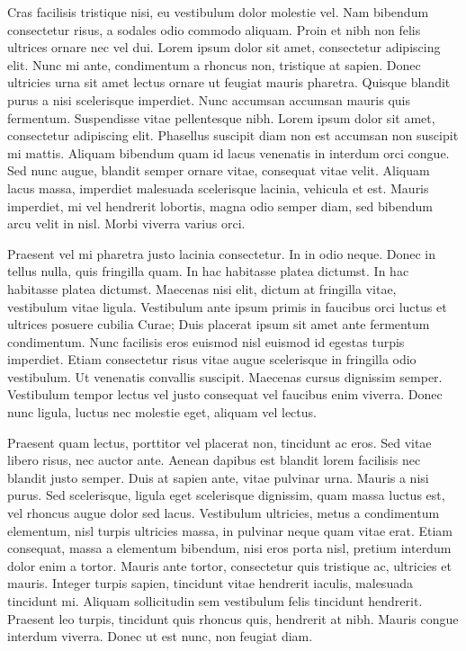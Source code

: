 \documentclass[a4paper, 12pt]{article}
\begin{document}
Cras facilisis tristique nisi, eu vestibulum dolor molestie vel. Nam
bibendum consectetur risus, a sodales odio commodo aliquam. Proin et
nibh non felis ultrices ornare nec vel dui. Lorem ipsum dolor sit
amet, consectetur adipiscing elit. Nunc mi ante, condimentum a rhoncus
non, tristique at sapien. Donec ultricies urna sit amet lectus ornare
ut feugiat mauris pharetra. Quisque blandit purus a nisi scelerisque
imperdiet. Nunc accumsan accumsan mauris quis fermentum. Suspendisse
vitae pellentesque nibh. Lorem ipsum dolor sit amet, consectetur
adipiscing elit. Phasellus suscipit diam non est accumsan non suscipit
mi mattis. Aliquam bibendum quam id lacus venenatis in interdum orci
congue. Sed nunc augue, blandit semper ornare vitae, consequat vitae
velit. Aliquam lacus massa, imperdiet malesuada scelerisque lacinia,
vehicula et est. Mauris imperdiet, mi vel hendrerit lobortis, magna
odio semper diam, sed bibendum arcu velit in nisl. Morbi viverra
varius orci.

Praesent vel mi pharetra justo lacinia consectetur. In in odio neque.
Donec in tellus nulla, quis fringilla quam. In hac habitasse platea
dictumst. In hac habitasse platea dictumst. Maecenas nisi elit, dictum
at fringilla vitae, vestibulum vitae ligula. Vestibulum ante ipsum
primis in faucibus orci luctus et ultrices posuere cubilia Curae; Duis
placerat ipsum sit amet ante fermentum condimentum. Nunc facilisis
eros euismod nisl euismod id egestas turpis imperdiet. Etiam
consectetur risus vitae augue scelerisque in fringilla odio
vestibulum. Ut venenatis convallis suscipit. Maecenas cursus dignissim
semper. Vestibulum tempor lectus vel justo consequat vel faucibus enim
viverra. Donec nunc ligula, luctus nec molestie eget, aliquam vel
lectus.

Praesent quam lectus, porttitor vel placerat non, tincidunt ac eros.
Sed vitae libero risus, nec auctor ante. Aenean dapibus est blandit
lorem facilisis nec blandit justo semper. Duis at sapien ante, vitae
pulvinar urna. Mauris a nisi purus. Sed scelerisque, ligula eget
scelerisque dignissim, quam massa luctus est, vel rhoncus augue dolor
sed lacus. Vestibulum ultricies, metus a condimentum elementum, nisl
turpis ultricies massa, in pulvinar neque quam vitae erat. Etiam
consequat, massa a elementum bibendum, nisi eros porta nisl, pretium
interdum dolor enim a tortor. Mauris ante tortor, consectetur quis
tristique ac, ultricies et mauris. Integer turpis sapien, tincidunt
vitae hendrerit iaculis, malesuada tincidunt mi. Aliquam sollicitudin
sem vestibulum felis tincidunt hendrerit. Praesent leo turpis,
tincidunt quis rhoncus quis, hendrerit at nibh. Mauris congue interdum
viverra. Donec ut est nunc, non feugiat diam.
\end{document}
